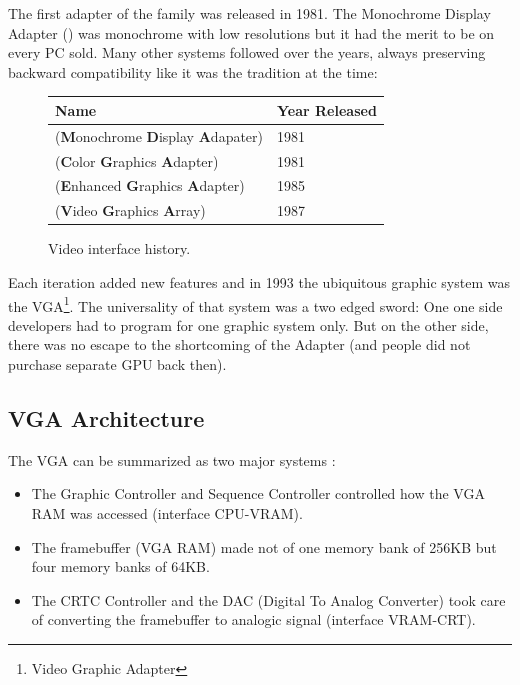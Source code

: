 \documentclass[book.tex]{subfiles}
\begin{document}
The first adapter of the family was released in 1981. The Monochrome Display
   Adapter () was monochrome with low resolutions but it had the merit to be on every PC sold. Many other systems followed over the years, always preserving backward compatibility like it was the tradition at the time:
\bigskip
  
 \begin{figure}[H]
\centering  
\begin{tabularx}{0.9\textwidth}{ X  Y }
  \toprule
  \textbf{Name} &  \textbf{Year Released} \\
  \toprule {}
   (\textbf{M}onochrome
   \textbf{D}isplay
   \textbf{A}dapater) & 1981 
   \\ 
   (\textbf{C}olor
   \textbf{G}raphics
   \textbf{A}dapter) & 1981 
    \\ 
   (\textbf{E}nhanced
   \textbf{G}raphics
   \textbf{A}dapter) & 1985
   \\ 
   (\textbf{V}ideo
   \textbf{G}raphics
   \textbf{A}rray)  & 1987
    \\
  \toprule
\end{tabularx}
\caption{Video interface history.}\label{fig:vga_history}
\end{figure}

Each iteration added new features and in 1993 the ubiquitous graphic system was the VGA\footnote{Video Graphic Adapter}. The universality of that system was a two edged sword: One one side developers had to program for one graphic system only. But on the other side, there was no escape to the shortcoming of the Adapter (and people did not purchase separate GPU back then).\\

\subsection{VGA Architecture}

The VGA can be summarized as two major systems :

\begin{itemize}
\item The Graphic Controller and Sequence Controller controlled how the VGA RAM was accessed (interface CPU-VRAM).
\item The framebuffer (VGA RAM) made not of one memory bank of 256KB but four memory banks of 64KB.
\item The CRTC Controller and the DAC (Digital To Analog Converter) took care of converting the framebuffer to analogic signal (interface VRAM-CRT).
\end{itemize}
\end{document}
